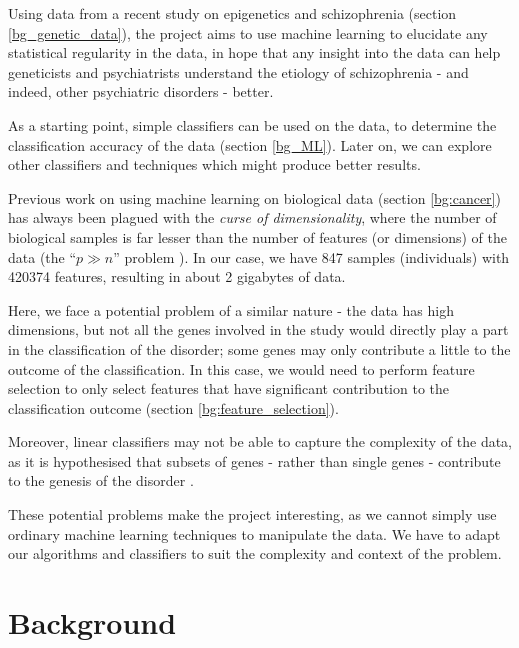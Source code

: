 \documentclass[12pt, twoside, a4paper]{report}
\begin{document}
Using data from a recent study on epigenetics and schizophrenia (section \ref{bg_genetic_data}), the project aims to use machine learning to elucidate any statistical regularity in the data, in hope that any insight into the data can help geneticists and psychiatrists understand the etiology of schizophrenia - and indeed, other psychiatric disorders - better.

As a starting point, simple classifiers can be used on the data, to determine the classification accuracy of the data (section \ref{bg_ML}). Later on, we can explore other classifiers and techniques which might produce better results.

Previous work on using machine learning on biological data (section \ref{bg:cancer}) has always been plagued with the \textit{curse of dimensionality}, where the number of biological samples is far lesser than the number of features (or dimensions) of the data (the ``$p \gg n$'' problem \cite{RefWorks:96}). In our case, we have 847 samples (individuals) with 420374 features, resulting in about 2 gigabytes of data.

Here, we face a potential problem of a similar nature - the data has high dimensions, but not all the genes involved in the study would directly play a part in the classification of the disorder; some genes may only contribute a little to the outcome of the classification. In this case, we would need to perform feature selection to only select features that have significant contribution to the classification outcome (section \ref{bg:feature_selection}).

Moreover, linear classifiers may not be able to capture the complexity of the data, as it is hypothesised that subsets of genes - rather than single genes - contribute to the genesis of the disorder \cite{RefWorks:10}.

These potential problems make the project interesting, as we cannot simply use ordinary machine learning techniques to manipulate the data. We have to adapt our algorithms and classifiers to suit the complexity and context of the problem.

\chapter{Background}

\end{document}
